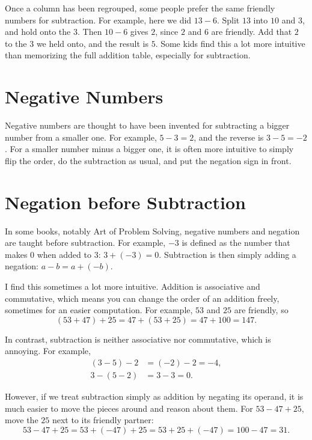 Once a column has been regrouped, some people prefer the same friendly numbers for subtraction. For example, here we did $13 - 6$. Split $13$ into $10$ and $3$, and hold onto the $3$. Then $10 - 6$ gives $2$, since $2$ and $6$ are friendly. Add that $2$ to the $3$ we held onto, and the result is $5$. Some kids find this a lot more intuitive than memorizing the full addition table, especially for subtraction.

\section{Negative Numbers}

Negative numbers are thought to have been invented for subtracting a bigger number from a smaller one. For example, $5 - 3 = 2$, and the reverse is $3 - 5 = -2$. For a smaller number minus a bigger one, it is often more intuitive to simply flip the order, do the subtraction as usual, and put the negation sign in front.

\section{Negation before Subtraction}

In some books, notably Art of Problem Solving, negative numbers and negation are taught before subtraction. For example, $-3$ is defined as the number that makes $0$ when added to $3$: $3 + (-3) = 0$. Subtraction is then simply adding a negation: $a - b = a + (-b)$.

I find this sometimes a lot more intuitive. Addition is associative and commutative, which means you can change the order of an addition freely, sometimes for an easier computation. For example, $53$ and $25$ are friendly, so
\[
  (53 + 47) + 25 = 47 + (53 + 25) = 47 + 100 = 147.
\]

In contrast, subtraction is neither associative nor commutative, which is annoying. For example,
\begin{align*}
  (3 - 5) - 2 &= (-2) - 2 = -4, \\
  3 - (5 - 2) &= 3 - 3 = 0.
\end{align*}

However, if we treat subtraction simply as addition by negating its operand, it is much easier to move the pieces around and reason about them. For $53 - 47 + 25$, move the $25$ next to its friendly partner:
\[
  53 - 47 + 25 = 53 + (-47) + 25 = 53 + 25 + (-47) = 100 - 47 = 31.
\]
